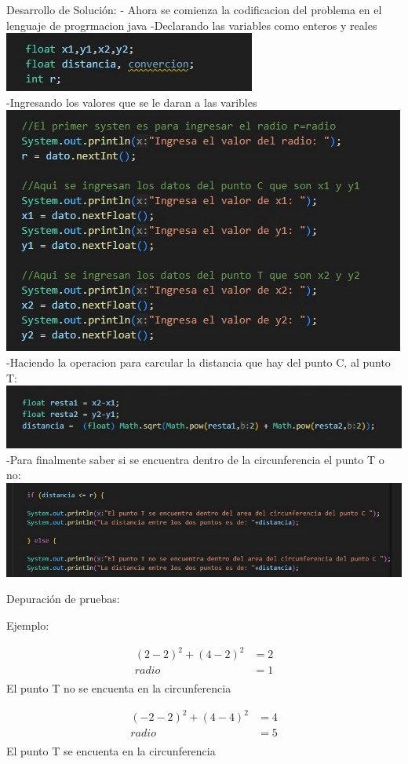\documentclass{IEEEcsmag}
\begin{document}
\begin{enumerate}
    Desarrollo de Solución:
    - Ahora se comienza la codificacion del problema en el lenguaje de progrmacion java 
    -Declarando las variables como enteros y reales  \\
    \centering
    \includegraphics[width=0.5\linewidth]{./latex_imagenes/Img_ejer3_6.jpg}  \\
    -Ingresando los valores que se le daran a las varibles \\
    \centering
    \includegraphics[width=0.5\linewidth]{./latex_imagenes/img_ejer3_4.jpg}  \\
    -Haciendo la operacion para carcular la distancia que hay del punto C, al punto T:
   \centering
    \includegraphics[width=0.5\linewidth]{./latex_imagenes/img_ejer3_3.jpg} \\
    -Para finalmente saber si se encuentra dentro de la circunferencia el punto T o no: \\
    \centering
    \includegraphics[width=0.5\linewidth]{./latex_imagenes/Img_ejer3_5.jpg}

    Depuración de pruebas:

    Ejemplo:

    \begin{align*}
    (2-2)^{2} + (4-2)^{2} &= 2\\
    radio &= 1\\
    \end{align*}
    El punto T no se encuenta en la circunferencia
   
    \begin{align*}
    (-2-2)^{2} + (4-4)^{2} &= 4\\
    radio &= 5\\
    \end{align*}
    El punto T se encuenta en la circunferencia


\end{enumerate}
\end{document}
